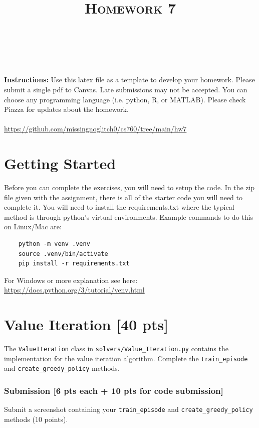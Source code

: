 \documentclass[a4paper]{article}
\title{\textsc{Homework 7}} %
\author{
\red{$>>$Martin Diges$<<$} \\
\red{$>>$9080689699$<<$}\\
}
\date{}
\theoremstyle{definition}
\begin{document}
\maketitle 

\textbf{Instructions:}
Use this latex file as a template to develop your homework. Please submit a single pdf to Canvas. Late submissions may not be accepted. You can choose any programming language (i.e. python, R, or MATLAB). Please check Piazza for updates about the homework.
\vspace{0.1in}
\\\\
\url{https://github.com/missingnoglitch0/cs760/tree/main/hw7}

\section{Getting Started}
Before you can complete the exercises, you will need to setup the code.
%
In the zip file given with the assignment, there is all of the starter code you will need to complete it.
%
You will need to install the requirements.txt where the typical method is through python's virtual environments.
%
Example commands to do this on Linux/Mac are:
\begin{verbatim}
    python -m venv .venv
    source .venv/bin/activate
    pip install -r requirements.txt 
\end{verbatim}
%

For Windows or more explanation see here: \url{https://docs.python.org/3/tutorial/venv.html}

\section{Value Iteration [40 pts]}

The \verb|ValueIteration| class in \verb|solvers/Value_Iteration.py| contains the implementation for the value iteration algorithm. Complete the \verb|train_episode| and \verb|create_greedy_policy| methods.

\subsubsection*{Submission [6 pts each + 10 pts for code submission]}

Submit a screenshot containing your \verb|train_episode| and \verb|create_greedy_policy| methods (10 points).
\end{document}

